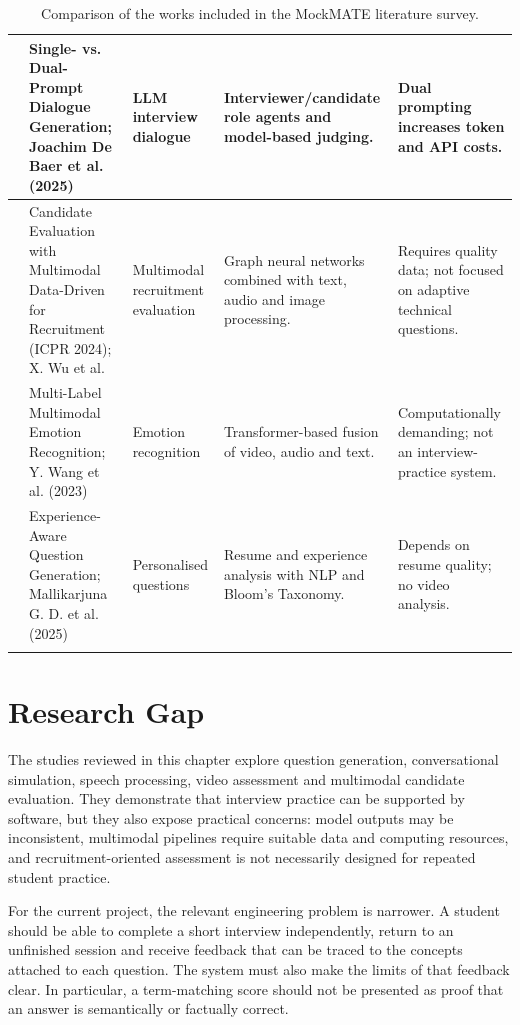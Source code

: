 \documentclass[12pt,a4paper,oneside]{report}
\begin{document}
\begin{longtable}{|>{\centering\arraybackslash}p{0.8cm}|>{\raggedright\arraybackslash}p{3.0cm}|>{\raggedright\arraybackslash}p{2.2cm}|>{\raggedright\arraybackslash}p{4.0cm}|>{\raggedright\arraybackslash}p{3.6cm}|}
\hline
9 & Single- vs. Dual-Prompt Dialogue Generation; Joachim De Baer et al. (2025) & LLM interview dialogue & Interviewer/candidate role agents and model-based judging. & Dual prompting increases token and API costs. \\
\hline
10 & Candidate Evaluation with Multimodal Data-Driven for Recruitment (ICPR 2024); X. Wu et al. & Multimodal recruitment evaluation & Graph neural networks combined with text, audio and image processing. & Requires quality data; not focused on adaptive technical questions. \\
\hline
11 & Multi-Label Multimodal Emotion Recognition; Y. Wang et al. (2023) & Emotion recognition & Transformer-based fusion of video, audio and text. & Computationally demanding; not an interview-practice system. \\
\hline
12 & Experience-Aware Question Generation; Mallikarjuna G. D. et al. (2025) & Personalised questions & Resume and experience analysis with NLP and Bloom's Taxonomy. & Depends on resume quality; no video analysis. \\
\hline
\caption{Comparison of the works included in the MockMATE literature survey.}
\label{tab:literature-comparison}
\end{longtable}
\endgroup

\section{Research Gap}
The studies reviewed in this chapter explore question generation, conversational simulation, speech processing, video assessment and multimodal candidate evaluation. They demonstrate that interview practice can be supported by software, but they also expose practical concerns: model outputs may be inconsistent, multimodal pipelines require suitable data and computing resources, and recruitment-oriented assessment is not necessarily designed for repeated student practice.

For the current project, the relevant engineering problem is narrower. A student should be able to complete a short interview independently, return to an unfinished session and receive feedback that can be traced to the concepts attached to each question. The system must also make the limits of that feedback clear. In particular, a term-matching score should not be presented as proof that an answer is semantically or factually correct.
\end{document}
